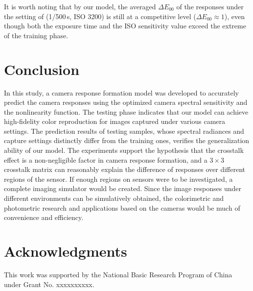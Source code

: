 \documentclass[9pt,twocolumn,twoside]{osajnl}
\begin{document}
	It is worth noting that by our model, the averaged $\Delta{}E_{00}$ of the responses under the setting of (1/500\,s, ISO 3200) is still at a competitive level ($\Delta{}E_{00}\approx1$), even though both the exposure time and the ISO sensitivity value exceed the extreme of the training phase.
	
	\section{Conclusion}\label{conclusion}
	
	In this study, a camera response formation model was developed to accurately predict the camera responses using the optimized camera spectral sensitivity and the nonlinearity function. The testing phase indicates that our model can achieve high-fidelity color reproduction for images captured under various camera settings. The prediction results of testing samples, whose spectral radiances and capture settings distinctly differ from the training ones, verifies the generalization ability of our model. The experiments support the hypothesis that the crosstalk effect is a non-negligible factor in camera response formation, and a $3\times3$ crosstalk matrix can reasonably explain the difference of responses over different regions of the sensor. If enough regions on sensors were to be investigated, a complete imaging simulator would be created. Since the image responses under different environments can be simulatively obtained, the colorimetric and photometric research and applications based on the cameras would be much of convenience and efficiency.
	
	\section*{Acknowledgments}\label{acknowledgments}
	This work was supported by the National Basic Research Program of China under Grant No. xxxxxxxxxx.
	
	\bigskip
	
	
\end{document}
